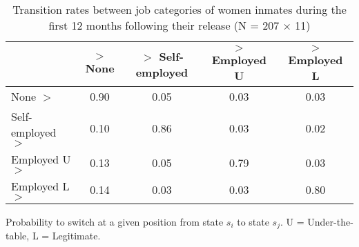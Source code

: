 \begin{table}[htp]
\footnotesize
\setlength{\tabcolsep}{10pt}
\renewcommand{\arraystretch}{1.3}
\begin{threeparttable}
\centering
\caption{Transition rates between job categories of women inmates \newline
    during the first 12 months following their release (N = 207 $\times$ 11)} 
\label{tab:transition_rates_jobs}
\begin{tabular}{lcccc}
  \hline
 & $>$ None & $>$ Self-employed & $>$ Employed U & $>$ Employed L \\ 
  \hline
None $>$ & 0.90 & 0.05 & 0.03 & 0.03 \\ 
  Self-employed $>$ & 0.10 & 0.86 & 0.03 & 0.02 \\ 
  Employed U $>$ & 0.13 & 0.05 & 0.79 & 0.03 \\ 
  Employed L $>$ & 0.14 & 0.03 & 0.03 & 0.80 \\ 
   \hline
\end{tabular}
\begin{tablenotes}
\scriptsize
\item Probability to switch at a given position from state $s_i$ to state $s_j$. U = Under-the-table, L = Legitimate.
\end{tablenotes}
\end{threeparttable}
\end{table}

